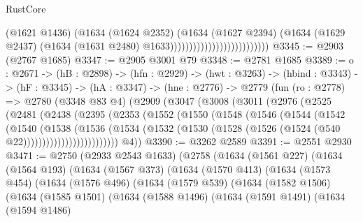 \begin{lexlean}{RustCore}
\begin{coremodule}
                                                (@1621 @1436)
                                                (@1634
                                                  (@1624 @2352)
                                                  (@1634
                                                    (@1627 @2394)
                                                    (@1634
                                                      (@1629 @2437)
                                                      (@1634
                                                        (@1631 @2480)
                                                        @1633))))))))))))))))))))))))))
@3345 := @2903 (@2767 @1685)
@3347 := @2905 @3001 @79
@3348 := @2781 @1685
@3389 := {o : @2671} ->
  (hB : @2898) ->
  (hfn : @2929) ->
  (hwt : @3263) ->
  (hbind : @3343) ->
  (hF : @3345) ->
  (hA : @3347) ->
  (hne : @2776) ->
  @2779
    (fun (ro : @2778) =>
    @2780
      (@3348 @83 @4)
      (@2909
        (@3047
          (@3008
            (@3011
              (@2976
                (@2525
                  (@2481
                    (@2438
                      (@2395
                        (@2353
                          (@1552
                            (@1550
                              (@1548
                                (@1546
                                  (@1544
                                    (@1542
                                      (@1540
                                        (@1538
                                          (@1536
                                            (@1534
                                              (@1532
                                                (@1530
                                                  (@1528
                                                    (@1526 (@1524 (@540 @22)))))))))))))))))))))))))
        @4))
@3390 := @3262 @2589
@3391 := @2551 @2930
@3471 := @2750
    (@2933 @2543 @1633)
    (@2758
      (@1634
        (@1561 @227)
        (@1634
          (@1564 @193)
          (@1634
            (@1567 @373)
            (@1634
              (@1570 @413)
              (@1634
                (@1573 @454)
                (@1634
                  (@1576 @496)
                  (@1634
                    (@1579 @539)
                    (@1634
                      (@1582 @1506)
                      (@1634
                        (@1585 @1501)
                        (@1634
                          (@1588 @1496)
                          (@1634
                            (@1591 @1491)
                            (@1634
                              (@1594 @1486)

\end{coremodule}
\end{lexlean}
